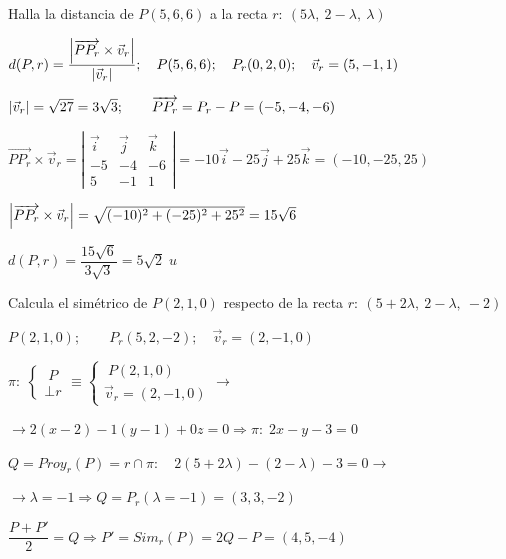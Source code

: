 \begin{ejre} Halla la distancia de $P(5,6,6)$ a la recta $r:\  (5\lambda,\  2-\lambda,\  \lambda )$	
\end{ejre}

\begin{proofw}\renewcommand{\qedsymbol}{$\diamond$}	 
\noindent $d(P,r)=\dfrac {\abs{\overrightarrow{PP_r} \times \vec v_r }}{\abs{\vec v_r}};\quad P(5,6,6);\quad P_r(0,2,0);\quad \vec v_r=(5,-1,1)$

\noindent $\abs{\vec v_r}=\sqrt{27}=3\sqrt{3};\qquad \overrightarrow{PP_r}=P_r-P=(-5,-4,-6)$

\noindent $\overrightarrow{PP_r}\times \vec v_r=\left| \begin{matrix} \vec i&\vec j&\vec k \\ -5&-4&-6 \\ 5&-1&1 \end{matrix} \right|=-10\vec i -25 \vec j +25 \vec k =(-10,-25,25)$

\noindent $\abs{\overrightarrow{PP_r}\times \vec v_r}=\sqrt{(-10)^2+(-25)^2+25^2}=15\sqrt{6}$

\noindent $d(P,r)=\dfrac {15\sqrt{6}}{3\sqrt{3}}=5\sqrt{2}\; u$

\end{proofw}

\begin{ejre} Calcula el simétrico de $P(2,1,0)$ respecto de la recta $r:\  (5+2\lambda, \  2-\lambda, \  -2)$	
\end{ejre}

\begin{proofw}\renewcommand{\qedsymbol}{$\diamond$}	 
\noindent $P(2,1,0);\qquad P_r(5,2,-2);\quad \vec v_r=(2,-1,0)$

\noindent $\pi:\;\begin{cases}\;P\\ \bot r \end{cases}\equiv \begin{cases} \;P(2,1,0) \\ \vec v_r=(2,-1,0) \end{cases} \to $

\noindent $\to 2(x-2)-1(y-1)+0z=0 \Rightarrow \pi:\; 2x-y-3=0$

\noindent $Q=Proy_r (P)=r\cap \pi:\quad 2(5+2\lambda)-(2-\lambda)-3=0 \to $

\noindent $\to \lambda=-1 \Rightarrow Q=P_r(\lambda=-1)=(3,3,-2)$

\noindent $\dfrac {P+P'}{2}=Q \Rightarrow P'=Sim_r (P)=2Q-P=(4,5,-4)$	
\end{proofw}


